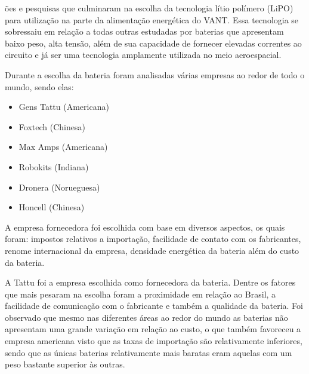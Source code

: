 ões e pesquisas que culminaram na escolha da tecnologia lítio polímero (LiPO) para utilização na parte da alimentação energética do VANT. Essa tecnologia se sobressaiu em relação a todas outras estudadas por baterias que apresentam baixo peso, alta tensão, além de sua capacidade de fornecer elevadas correntes ao circuito e já ser uma tecnologia amplamente utilizada no meio aeroespacial.

Durante a escolha da bateria foram analisadas várias empresas ao redor de todo o mundo, sendo elas:

\begin{itemize}
 
\item Gens Tattu (Americana)

\item Foxtech (Chinesa)

\item Max Amps (Americana)

\item Robokits (Indiana)

\item Dronera (Norueguesa)

\item Honcell (Chinesa)

\end{itemize}


A empresa fornecedora foi escolhida com base em diversos aspectos, os quais foram: impostos relativos a importação, facilidade de contato com os fabricantes, renome internacional da empresa, densidade energética da bateria além do custo da bateria.

A  Tattu foi a empresa escolhida como fornecedora da bateria.  Dentre os fatores que mais pesaram na escolha foram a proximidade em relação ao Brasil, a facilidade de comunicação com o fabricante e também a qualidade da bateria. Foi observado que mesmo nas diferentes áreas ao redor do mundo as baterias não apresentam uma grande variação em relação ao custo, o que também favoreceu a empresa americana visto que as taxas de importação são relativamente inferiores, sendo que as únicas baterias relativamente mais baratas eram aquelas com um peso bastante superior às outras.

